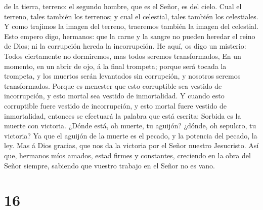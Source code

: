 de la tierra, terreno: el segundo hombre, que es el Señor, es del cielo.
 Cual el terreno, tales también los terrenos; y cual el
celestial, tales también los celestiales.  Y como trajimos
la imagen del terreno, traeremos también la imagen del celestial.
 Esto empero digo, hermanos: que la carne y la sangre no
pueden heredar el reino de Dios; ni la corrupción hereda la
incorrupción.  He aquí, os digo un misterio: Todos
ciertamente no dormiremos, mas todos seremos transformados,
 En un momento, en un abrir de ojo, á la final trompeta;
porque será tocada la trompeta, y los muertos serán levantados sin
corrupción, y nosotros seremos transformados.  Porque es
menester que esto corruptible sea vestido de incorrupción, y esto mortal
sea vestido de inmortalidad.  Y cuando esto corruptible
fuere vestido de incorrupción, y esto mortal fuere vestido de
inmortalidad, entonces se efectuará la palabra que está escrita: Sorbida
es la muerte con victoria.  ¿Dónde está, oh muerte, tu
aguijón? ¿dónde, oh sepulcro, tu victoria?  Ya que el
aguijón de la muerte es el pecado, y la potencia del pecado, la ley.
 Mas á Dios gracias, que nos da la victoria por el Señor
nuestro Jesucristo.  Así que, hermanos míos amados, estad
firmes y constantes, creciendo en la obra del Señor siempre, sabiendo
que vuestro trabajo en el Señor no es vano.

\hypertarget{section-15}{%
\section{16}\label{section-15}}

